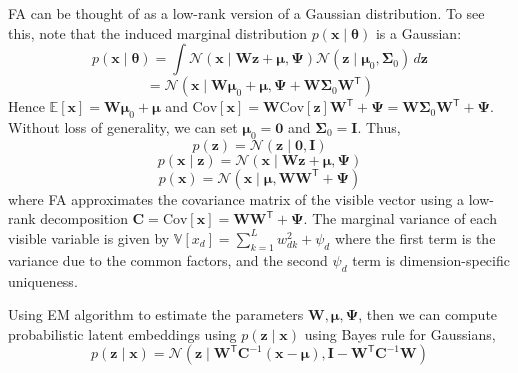 \documentclass[11pt]{article}
\begin{document}
FA can be thought of as a low-rank version of a Gaussian distribution. To see this, note that the induced marginal distribution $p(\boldsymbol{x} \mid \boldsymbol{\theta})$ is a Gaussian:
\[
p(\boldsymbol{x} \mid \boldsymbol{\theta}) = \int \mathcal{N}(\boldsymbol{x} \mid \mathbf{W}\boldsymbol{z} + \boldsymbol{\mu}, \boldsymbol{\Psi}) \mathcal{N}(\boldsymbol{z} \mid \boldsymbol{\mu}_0, \boldsymbol{\Sigma}_0) \, d\boldsymbol{z}
\]
\[
= \mathcal{N}(\boldsymbol{x} \mid \mathbf{W}\boldsymbol{\mu}_0 + \boldsymbol{\mu}, \boldsymbol{\Psi} + \mathbf{W}\boldsymbol{\Sigma}_0\mathbf{W}^\mathsf{T})
\]
Hence $\mathbb{E}[\boldsymbol{x}] = \mathbf{W}\boldsymbol{\mu}_0 + \boldsymbol{\mu}$ and $\text{Cov}[\boldsymbol{x}] = \mathbf{W}\text{Cov}[\boldsymbol{z}]\mathbf{W}^\mathsf{T} + \boldsymbol{\Psi} = \mathbf{W}\boldsymbol{\Sigma}_0\mathbf{W}^\mathsf{T} + \boldsymbol{\Psi}$. Without loss of generality, we can set $\boldsymbol{\mu}_0 = \mathbf{0}$ and $\boldsymbol{\Sigma}_0 = \boldsymbol{I}$. Thus,
\[
p(\boldsymbol{z}) = \mathcal{N}(\boldsymbol{z} \mid \mathbf{0}, \mathbf{I})
\]
\[
p(\boldsymbol{x} \mid \boldsymbol{z}) = \mathcal{N}(\boldsymbol{x} \mid \mathbf{W}\boldsymbol{z} + \boldsymbol{\mu}, \boldsymbol{\Psi})
\]
\[
p(\boldsymbol{x}) = \mathcal{N}(\boldsymbol{x} \mid \boldsymbol{\mu}, \mathbf{W}\mathbf{W}^\mathsf{T} + \boldsymbol{\Psi})
\]
where FA approximates the covariance matrix of the visible vector using a low-rank decomposition $\mathbf{C} = \text{Cov}[\boldsymbol{x}] = \mathbf{W}\mathbf{W}^\mathsf{T} + \boldsymbol{\Psi}$. The marginal
variance of each visible variable is given by $\mathbb{V}[x_d] = \sum_{k=1}^L w_{dk}^2 + \psi_d$ where the first term is the variance due to the common factors, and the second $\psi_d$ term is dimension-specific uniqueness.

Using EM algorithm to estimate the parameters $\mathbf{W},\boldsymbol{\mu},\boldsymbol{\Psi}$, then we can compute probabilistic latent embeddings using $p(\boldsymbol{z} \mid \boldsymbol{x})$ using Bayes rule for Gaussians,
\[
p(\boldsymbol{z} \mid \boldsymbol{x}) = \mathcal{N}(\boldsymbol{z} \mid \mathbf{W}^\mathsf{T}\mathbf{C}^{-1}(\boldsymbol{x} - \boldsymbol{\mu}), \mathbf{I} - \mathbf{W}^\mathsf{T}\mathbf{C}^{-1}\mathbf{W})
\]
\end{document}
